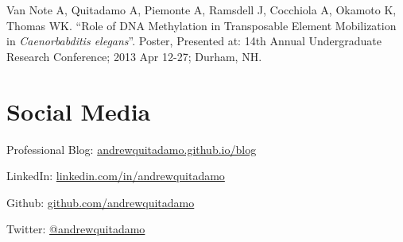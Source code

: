 \documentclass[margin,line]{res}
\begin{document}
\begin{resume}
Van Note A, Quitadamo A, Piemonte A, Ramsdell J, Cocchiola A, Okamoto K, Thomas WK. “Role of DNA Methylation in Transposable Element Mobilization in {\em Caenorbabditis elegans}”. Poster, Presented at: 14th Annual Undergraduate Research Conference; 2013 Apr 12-27; Durham, NH.

\section{\sc Social Media}

Professional Blog: \href{https://andrewquitadamo.github.io/blog}{andrewquitadamo.github.io/blog}

LinkedIn: \href{http://linkedin.com/in/andrewquitadamo}{linkedin.com/in/andrewquitadamo}

Github: \href{https://github.com/andrewquitadamo}{github.com/andrewquitadamo}

Twitter: \href{https://twitter.com/andrewquitadamo}{@andrewquitadamo}

\end{resume}
\end{document}
